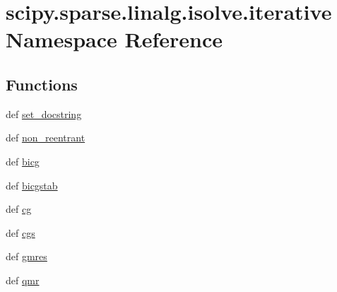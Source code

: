 \hypertarget{namespacescipy_1_1sparse_1_1linalg_1_1isolve_1_1iterative}{}\section{scipy.\+sparse.\+linalg.\+isolve.\+iterative Namespace Reference}
\label{namespacescipy_1_1sparse_1_1linalg_1_1isolve_1_1iterative}
\subsection*{Functions}
\begin{DoxyCompactItemize}
\item 
def \hyperlink{namespacescipy_1_1sparse_1_1linalg_1_1isolve_1_1iterative_a6939775ff487aaadd044ce49aa07ed4f}{set\+\_\+docstring}
\item 
def \hyperlink{namespacescipy_1_1sparse_1_1linalg_1_1isolve_1_1iterative_a9191284a50caa50fe31066b18cef8e39}{non\+\_\+reentrant}
\item 
def \hyperlink{namespacescipy_1_1sparse_1_1linalg_1_1isolve_1_1iterative_a412aeb6cd696b0cf8a9f88696f4c322a}{bicg}
\item 
def \hyperlink{namespacescipy_1_1sparse_1_1linalg_1_1isolve_1_1iterative_a6b1028494045b7bc13dc7eb4378142c4}{bicgstab}
\item 
def \hyperlink{namespacescipy_1_1sparse_1_1linalg_1_1isolve_1_1iterative_a7cd077c191170b5bd5cd1a1b04309cef}{cg}
\item 
def \hyperlink{namespacescipy_1_1sparse_1_1linalg_1_1isolve_1_1iterative_af7bc36a2aa10d31ce6f4b5afb2904c16}{cgs}
\item 
def \hyperlink{namespacescipy_1_1sparse_1_1linalg_1_1isolve_1_1iterative_abc26af16f67fdee14c5f62024ac0e8e0}{gmres}
\item 
def \hyperlink{namespacescipy_1_1sparse_1_1linalg_1_1isolve_1_1iterative_abda5650369b9bb1efec78bf061b45297}{qmr}
\end{DoxyCompactItemize}

